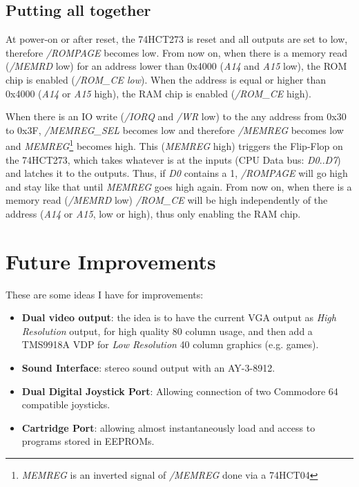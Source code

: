 \documentclass[a4paper,11pt]{article}
\begin{document}
    \subsection{Putting all together}
    
    At power-on or after reset, the 74HCT273 is reset and all outputs are set to
    low, therefore \textit{/ROMPAGE} becomes low. From now on, when there is a
    memory read (\textit{/MEMRD} low) for an address lower than 0x4000
    (\textit{A14} and \textit{A15} low), the ROM chip is enabled
    (\textit{/ROM\_CE low}). When the address is equal or higher than 0x4000
    (\textit{A14} or \textit{A15} high), the RAM chip is enabled
    (\textit{/ROM\_CE} high).

    When there is an IO write (\textit{/IORQ} and \textit{/WR} low) to the any
    address from 0x30 to 0x3F, \textit{/MEMREG\_SEL} becomes low and therefore 
    \textit{/MEMREG} becomes low and \textit{MEMREG}\footnote{\textit{MEMREG} is
    an inverted signal of \textit{/MEMREG} done via a 74HCT04} becomes high. This
    (\textit{MEMREG} high) triggers the Flip-Flop on the 74HCT273, which takes
    whatever is at the inputs (CPU Data bus: \textit{D0}..\textit{D7}) and
    latches it to the outputs. Thus, if \textit{D0} contains a 1,
    \textit{/ROMPAGE} will go high and stay like that until \textit{MEMREG} goes
    high again. From now on, when there is a memory read (\textit{/MEMRD} low)
    \textit{/ROM\_CE} will be high independently of the address (\textit{A14}
    or \textit{A15}, low or high), thus only enabling the RAM chip.

    \pagebreak
    \section{Future Improvements}

    These are some ideas I have for improvements:

    \begin{itemize}
        \item \textbf{Dual video output}: the idea is to have the current VGA
                output as \textit{High Resolution} output, for high quality 
                80 column usage, and then add a TMS9918A VDP for 
                \textit{Low Resolution} 40 column graphics (e.g. games).
        \item \textbf{Sound Interface}: stereo sound output with an AY-3-8912.
        \item \textbf{Dual Digital Joystick Port}: Allowing connection of two
                Commodore 64 compatible joysticks.
        \item \textbf{Cartridge Port}: allowing almost instantaneously load and
        access to programs stored in EEPROMs.
    \end{itemize}
\end{document}
